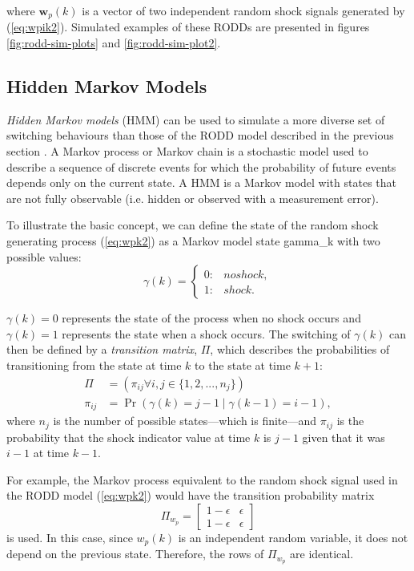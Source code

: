 where $\mathbf{w}_p(k)$ is a vector of two independent random shock signals generated by (\ref{eq:wpik2}). Simulated examples of these RODDs are presented in figures \ref{fig:rodd-sim-plots} and \ref{fig:rodd-sim-plot2}.

\subsection{Hidden Markov Models}

\textit{Hidden Markov models} (HMM) can be used to simulate a more diverse set of switching behaviours than those of the RODD model described in the previous section \citep{wong_realistic_2009}. A Markov process or Markov chain is a stochastic model used to describe a sequence of discrete events for which the probability of future events depends only on the current state. A HMM is a Markov model with states that are not fully observable (i.e. hidden or observed with a measurement error).

To illustrate the basic concept, we can define the state of the random shock generating process (\ref{eq:wpk2}) as a Markov model state \gls{gamma_k} with two possible values:
\begin{equation} \label{eq:gamma-k}
	\gamma(k) = 
	\begin{cases*}
		0: & no shock, \\
		1: & shock.
	\end{cases*}
\end{equation}

 
$\gamma(k)=0$ represents the state of the process when no shock occurs and $\gamma(k)=1$ represents the state when a shock occurs. The switching of $\gamma(k)$ can then be defined by a \textit{transition matrix}, $\Pi$, which describes the probabilities of transitioning from the state at time $k$ to the state at time $k+1$:
\begin{equation} \label{eq:Pi}
	\begin{aligned}
	\Pi &= \left(\pi_{ij} \forall i,j\in \{1,2,...,n_j\}\right) \\
	\pi_{ij} &= \Pr\left( \gamma(k)=j-1 \mid \gamma(k-1)=i-1 \right),
	\end{aligned}
\end{equation}
where $n_j$ is the number of possible states---which is finite---and $\pi_{ij}$ is the probability that the shock indicator value at time $k$ is $j-1$ given that it was $i-1$ at time $k-1$.

For example, the Markov process equivalent to the random shock signal used in the RODD model (\ref{eq:wpk2}) would have the transition probability matrix
\begin{equation} \label{eq:Pi-RODD-step}
	\Pi_{w_{p}} = \begin{bmatrix}
	1-\epsilon & \epsilon \\
	1-\epsilon & \epsilon
	\end{bmatrix}
\end{equation}
is used. In this case, since $w_{p}(k)$ is an independent random variable, it does not depend on the previous state. Therefore, the rows of $\Pi_{w_{p}}$ are identical.

